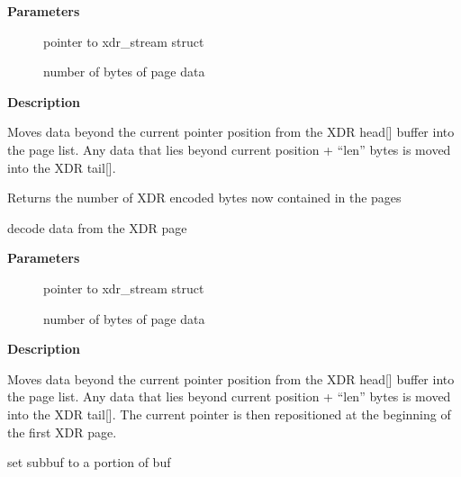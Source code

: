 \documentclass[a4paper,8pt,english]{sphinxmanual}
\begin{document}
\textbf{Parameters}
\begin{description}
\item[{}] \leavevmode
pointer to xdr\_stream struct

\item[{}] \leavevmode
number of bytes of page data

\end{description}

\textbf{Description}

Moves data beyond the current pointer position from the XDR head{[}{]} buffer
into the page list. Any data that lies beyond current position + ``len''
bytes is moved into the XDR tail{[}{]}.

Returns the number of XDR encoded bytes now contained in the pages

\begin{fulllineitems}
\label{networking/kapi:c.xdr_enter_page}
decode data from the XDR page

\end{fulllineitems}


\textbf{Parameters}
\begin{description}
\item[{}] \leavevmode
pointer to xdr\_stream struct

\item[{}] \leavevmode
number of bytes of page data

\end{description}

\textbf{Description}

Moves data beyond the current pointer position from the XDR head{[}{]} buffer
into the page list. Any data that lies beyond current position + ``len''
bytes is moved into the XDR tail{[}{]}. The current pointer is then
repositioned at the beginning of the first XDR page.

\begin{fulllineitems}
\label{networking/kapi:c.xdr_buf_subsegment}
set subbuf to a portion of buf

\end{fulllineitems}
\end{document}
